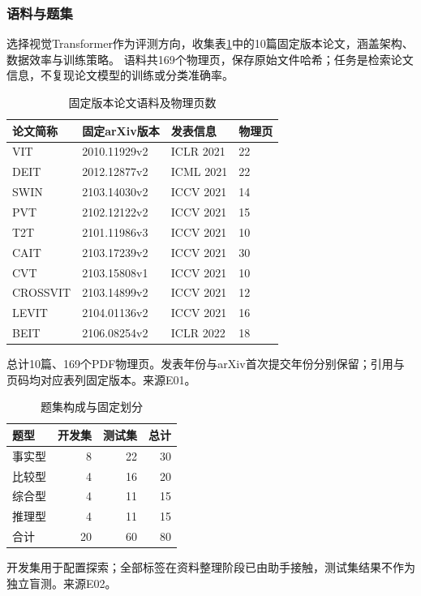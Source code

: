 \documentclass[UTF8,a4paper,zihao=-4,fontset=fandol]{ctexart}
\begin{document}
\subsubsection{语料与题集}
选择视觉Transformer作为评测方向，收集表\ref{tab:corpus}中的10篇固定版本论文，涵盖架构、数据效率与训练策略。
语料共169个物理页，保存原始文件哈希；任务是检索论文信息，不复现论文模型的训练或分类准确率。
\begin{table}[htbp]\centering
\caption{固定版本论文语料及物理页数}\label{tab:corpus}
\small\setlength{\tabcolsep}{4pt}\renewcommand{\arraystretch}{1.25}
\begin{tabularx}{\linewidth}{@{}Xlll@{}}\toprule
论文简称 & 固定arXiv版本 & 发表信息 & 物理页 \\ \midrule
VIT\cite{vit} & 2010.11929v2 & ICLR 2021 & 22 \\
DEIT\cite{deit} & 2012.12877v2 & ICML 2021 & 22 \\
SWIN\cite{swin} & 2103.14030v2 & ICCV 2021 & 14 \\
PVT\cite{pvt} & 2102.12122v2 & ICCV 2021 & 15 \\
T2T\cite{t2t} & 2101.11986v3 & ICCV 2021 & 10 \\
CAIT\cite{cait} & 2103.17239v2 & ICCV 2021 & 30 \\
CVT\cite{cvt} & 2103.15808v1 & ICCV 2021 & 10 \\
CROSSVIT\cite{crossvit} & 2103.14899v2 & ICCV 2021 & 12 \\
LEVIT\cite{levit} & 2104.01136v2 & ICCV 2021 & 16 \\
BEIT\cite{beit} & 2106.08254v2 & ICLR 2022 & 18 \\
\bottomrule\end{tabularx}
\par\vspace{2pt}\begin{minipage}{\linewidth}\footnotesize 总计10篇、169个PDF物理页。发表年份与arXiv首次提交年份分别保留；引用与页码均对应表列固定版本。来源E01。\end{minipage}
\end{table}
\begin{table}[htbp]\centering
\caption{题集构成与固定划分}\label{tab:dataset}
\small\setlength{\tabcolsep}{4pt}\renewcommand{\arraystretch}{1.25}
\begin{tabularx}{\linewidth}{@{}Xrrr@{}}\toprule
题型 & 开发集 & 测试集 & 总计 \\ \midrule
事实型 & 8 & 22 & 30 \\
比较型 & 4 & 16 & 20 \\
综合型 & 4 & 11 & 15 \\
推理型 & 4 & 11 & 15 \\
合计 & 20 & 60 & 80 \\
\bottomrule\end{tabularx}
\par\vspace{2pt}\begin{minipage}{\linewidth}\footnotesize 开发集用于配置探索；全部标签在资料整理阶段已由助手接触，测试集结果不作为独立盲测。来源E02。\end{minipage}
\end{table}
\end{document}
